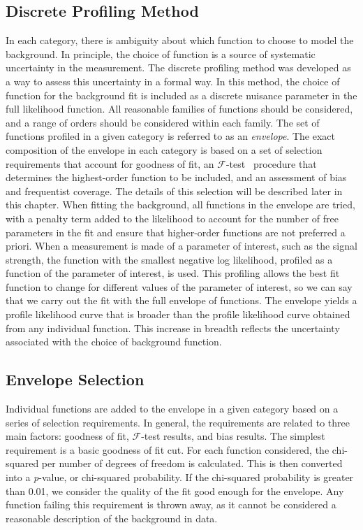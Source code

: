 \subsection{Discrete Profiling Method}\label{sec:envelope}
In each category, there is ambiguity about which function to choose to model the background. 
In principle, the choice of function is a source of systematic uncertainty in the measurement. 
The discrete profiling method was developed as a way to assess this uncertainty in a formal way. 
In this method, the choice of function for the background fit is included as a 
discrete nuisance parameter in the full likelihood function. All reasonable families of 
functions should be considered, and a range of orders should be considered within each family. 
The set of functions profiled in a given category is referred to as an \textit{envelope}.
The exact composition of the envelope in each category
is based on a set of selection requirements that account for goodness of fit, an $\mathcal{F}$-test~\cite{Fisher:1922saa} procedure that determines the highest-order function to be included, 
and an assessment of bias and frequentist coverage. The details of this selection will be described later in this chapter.
When fitting the background, all functions in the envelope are tried, with a penalty term added to the likelihood 
to account for the number of free parameters in the fit and ensure that higher-order functions are not preferred a priori. When a measurement is made of 
a parameter of interest, such as the signal strength, the function with the smallest negative log likelihood, 
profiled as a function of the parameter of interest, is used. This profiling allows the best fit function to change for 
different values of the parameter of interest, so we can say that we carry out the fit with the full envelope of functions.  
The envelope yields a profile likelihood curve that is broader than the profile likelihood curve obtained from any individual function. 
This increase in breadth reflects the uncertainty associated with the choice of background function. 

\subsection{Envelope Selection}\label{sec:envelope_selection}
Individual functions are added to the envelope in a given category based on a series of selection requirements. In general, 
the requirements are related to three main factors: goodness of fit, $\mathcal{F}$-test results, and bias results. 
The simplest requirement is a basic goodness of fit cut. For each function considered, the chi-squared per number of degrees of freedom is calculated. This is 
then converted into a \textit{p}-value, or chi-squared probability. If the chi-squared probability is greater than 0.01, we consider 
the quality of the fit good enough for the envelope. Any function failing this requirement is thrown away, as it cannot
be considered a reasonable description of the background in data. 


